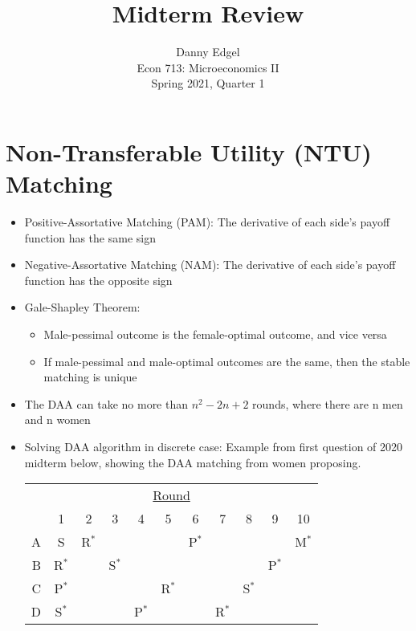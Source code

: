 \documentclass{article}
\begin{document}
\title{	Midterm Review }
\author{ 	Danny Edgel 					\\ 
		Econ 713: Microeconomics II		\\
		Spring 2021, Quarter 1			\\
		}
\maketitle\thispagestyle{empty}




\section*{Non-Transferable Utility (NTU) Matching}

\begin{itemize}
	\item Positive-Assortative Matching (PAM): The derivative of each side’s payoff function has the same sign
	
	\item Negative-Assortative Matching (NAM): The derivative of each side’s payoff function has the opposite sign
	
	\item Gale-Shapley Theorem:
	
	\begin{itemize}
		
		\item Male-pessimal outcome is the female-optimal outcome, and vice versa
		
		\item If male-pessimal and male-optimal outcomes are the same, then the stable matching is unique
	
	\end{itemize}
	
	\item The DAA can take no more than $n^2-2n+2$ rounds, where there are n men and n women
	
	\item Solving DAA algorithm in discrete case: Example from first question of 2020 midterm below, showing the DAA matching from women proposing.
		\begin{center}
			\begin{tabular}{r|c|c|c|c|c|c|c|c|c|c}
			\multicolumn{11}{c}{\underline{Round}} \\ 
			 	& 1 		& 2 		& 3 		& 4 		& 5 		& 6		& 7 		& 8 		& 9 		& 10	\\\hline
			  A 	& S 		& R$^*$	& 		& 		&		& P$^*$	&		&		&		& M$^*$ \\\hline
			  B 	& R$^*$ 	& 		& S$^*$	& 		&		&		&		&		& P$^*$	& \\\hline
			  C 	& P$^*$ 	& 		& 		& 		& R$^*$ 	&		&		& S$^*$	&		& \\\hline
			  D	& S$^*$	& 		& 		& P$^*$	&		&		& R$^*$ 	&		&		& \\\hline
			\end{tabular}
		\end{center}
	
	
\end{itemize}
\end{document}
